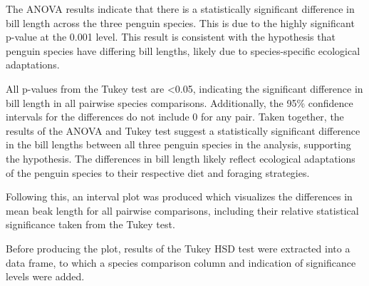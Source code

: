 \documentclass[
]{article}
\begin{document}
The ANOVA results indicate that there is a statistically significant
difference in bill length across the three penguin species. This is due
to the highly significant p-value at the 0.001 level. This result is
consistent with the hypothesis that penguin species have differing bill
lengths, likely due to species-specific ecological adaptations.

All p-values from the Tukey test are \textless0.05, indicating the
significant difference in bill length in all pairwise species
comparisons. Additionally, the 95\% confidence intervals for the
differences do not include 0 for any pair. Taken together, the results
of the ANOVA and Tukey test suggest a statistically significant
difference in the bill lengths between all three penguin species in the
analysis, supporting the hypothesis. The differences in bill length
likely reflect ecological adaptations of the penguin species to their
respective diet and foraging strategies.

Following this, an interval plot was produced which visualizes the
differences in mean beak length for all pairwise comparisons, including
their relative statistical significance taken from the Tukey test.

Before producing the plot, results of the Tukey HSD test were extracted
into a data frame, to which a species comparison column and indication
of significance levels were added.
\end{document}
